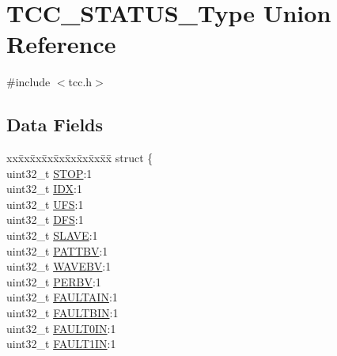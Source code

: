 \hypertarget{union_t_c_c___s_t_a_t_u_s___type}{}\section{T\+C\+C\+\_\+\+S\+T\+A\+T\+U\+S\+\_\+\+Type Union Reference}
\label{union_t_c_c___s_t_a_t_u_s___type}


{\ttfamily \#include $<$tcc.\+h$>$}

\subsection*{Data Fields}
\begin{DoxyCompactItemize}
\item 
\begin{tabbing}
xx\=xx\=xx\=xx\=xx\=xx\=xx\=xx\=xx\=\kill
struct \{\\
\>uint32\_t \mbox{\hyperlink{union_t_c_c___s_t_a_t_u_s___type_acf22281bf49b8a7256c9269d771e555b}{STOP}}:1\\
\>uint32\_t \mbox{\hyperlink{union_t_c_c___s_t_a_t_u_s___type_aac6456a5147b4eca71fdfe83ae1089ff}{IDX}}:1\\
\>uint32\_t \mbox{\hyperlink{union_t_c_c___s_t_a_t_u_s___type_a1654bab1cafc8412acbb76e3af548f8c}{UFS}}:1\\
\>uint32\_t \mbox{\hyperlink{union_t_c_c___s_t_a_t_u_s___type_a19b07df6dae8764d8f1f27de4d839308}{DFS}}:1\\
\>uint32\_t \mbox{\hyperlink{union_t_c_c___s_t_a_t_u_s___type_a3a6ede00806bc5995d317cd6ed9dbbe5}{SLAVE}}:1\\
\>uint32\_t \mbox{\hyperlink{union_t_c_c___s_t_a_t_u_s___type_aa2053b17fd4155122987b0025b0d9941}{PATTBV}}:1\\
\>uint32\_t \mbox{\hyperlink{union_t_c_c___s_t_a_t_u_s___type_a7cb2c64456be6bfca67c8cca6126b2fc}{WAVEBV}}:1\\
\>uint32\_t \mbox{\hyperlink{union_t_c_c___s_t_a_t_u_s___type_a0840e3b15b1c2491296b355d8e057457}{PERBV}}:1\\
\>uint32\_t \mbox{\hyperlink{union_t_c_c___s_t_a_t_u_s___type_a099216b5e287641a923e0fd816e75237}{FAULTAIN}}:1\\
\>uint32\_t \mbox{\hyperlink{union_t_c_c___s_t_a_t_u_s___type_a1fd9b6256fbe45d6797f39a736ace90d}{FAULTBIN}}:1\\
\>uint32\_t \mbox{\hyperlink{union_t_c_c___s_t_a_t_u_s___type_a84e536ebad5c59b3744077fed23565e2}{FAULT0IN}}:1\\
\>uint32\_t \mbox{\hyperlink{union_t_c_c___s_t_a_t_u_s___type_acd973a470f81c20e000d329acf67428d}{FAULT1IN}}:1\\

\end{tabbing}
\end{DoxyCompactItemize}
